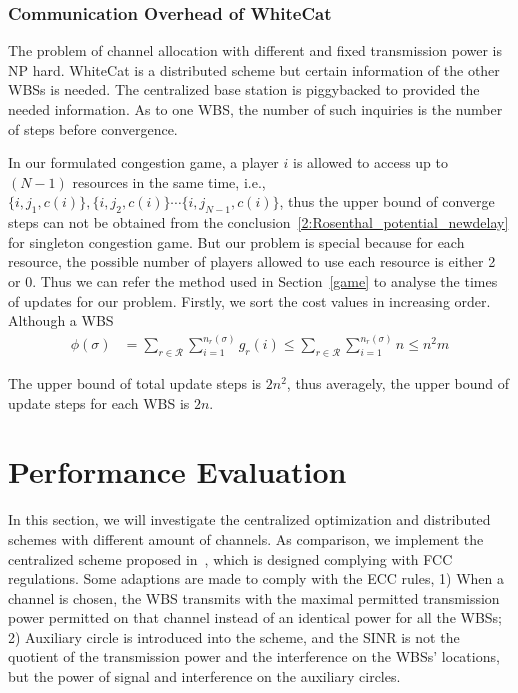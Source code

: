 \documentclass[times]{ettauth}
\newcommand{\ie}{i.e., }
\theoremstyle{mytheoremstyle}
\theoremstyle{mytheoremstyle}
\theoremstyle{mytheoremstyle}
\begin{document}
\subsubsection{Communication Overhead of WhiteCat}

The problem of channel allocation with different and fixed transmission power is NP hard.
WhiteCat is a distributed scheme but certain information of the other WBSs is needed.
The centralized base station is piggybacked to provided the needed information.
As to one WBS, the number of such inquiries is the number of steps before convergence.

In our formulated congestion game, a player $i$ is allowed to access up to $(N-1)$ resources in the same time, \ie $\{i, j_1, c(i)\}, \{i, j_2, c(i)\} \cdots \{i, j_{N-1}, c(i)\}$, thus the upper bound of converge steps can not be obtained from the conclusion~\ref{2:Rosenthal_potential_newdelay} for singleton congestion game.
But our problem is special because for each resource, the possible number of players allowed to use each resource is either 2 or 0.
Thus we can refer the method used in Section~\ref{game} to analyse the times of updates for our problem.
Firstly, we sort the cost values in increasing order.
Although a WBS 
\begin{equation}
\label{2:Rosenthal_potential_newdelay}
\begin{split}
\phi(\sigma) 
& =\sum\limits^{}_{r\in \mathcal{R}} \sum\limits^{n_r(\sigma)}_{i=1} g_r(i) \leq \sum\limits^{}_{r\in \mathcal{R}} \sum\limits^{n_r(\sigma)}_{i=1} n \leq n^2m
\end{split}
\end{equation}

The upper bound of total update steps is $2n^2$, thus averagely, the upper bound of update steps for each WBS is $2n$.


\section{Performance Evaluation}
\label{simulation}
In this section, we will investigate the centralized optimization and distributed schemes with different amount of channels.
As comparison, we implement the centralized scheme proposed in~\cite{ReAlloTVWS14DySPAN}, which is designed complying with FCC regulations.
Some adaptions are made to comply with the ECC rules, 1) When a channel is chosen, the WBS transmits with the maximal permitted transmission power permitted on that channel instead of an identical power for all the WBSs; 2) Auxiliary circle is introduced into the scheme, and the SINR is not the quotient of the transmission power and the interference on the WBSs' locations, but the power of signal and interference on the auxiliary circles.
\end{document}
